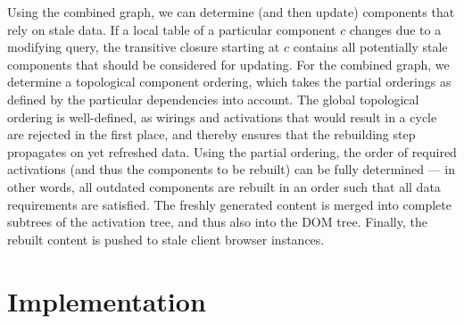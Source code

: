 \documentclass{src/acm_proc_article-sp} \else
\begin{document}
Using the combined graph, we can determine (and then update)
components that rely on stale data. If a local table of a particular
component $c$ changes due to a modifying query, the transitive
closure starting at $c$ contains all potentially stale components
that should be considered for updating. For the combined graph, we
determine a topological component ordering, which takes the partial
orderings as defined by the particular dependencies into account. The
global topological ordering is well-defined, as wirings and
activations that would result in a cycle are rejected in the first
place, and thereby ensures that the rebuilding step propagates on yet
refreshed data. Using the partial ordering, the order of required
activations (and thus the components to be rebuilt) can be fully
determined --- in other words, all outdated components are rebuilt in
an order such that all data requirements are satisfied. The freshly
generated content is merged into complete subtrees of the activation
tree, and thus also into the DOM tree. Finally, the rebuilt content
is pushed to stale client browser instances.
   \section{Implementation}
\label{implementation}
\end{document}
